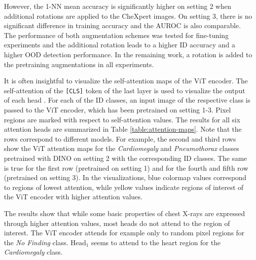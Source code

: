 However, the 1-NN mean accuracy is significantly higher on setting 2 when additional rotations are applied to the CheXpert images.
On setting 3, there is no significant difference in training accuracy and the AUROC is also comparable.
The performance of both augmentation schemes was tested for fine-tuning experiments and the additional rotation leads to a higher ID accuracy and a higher OOD detection performance. 
In the remaining work, a rotation is added to the pretraining augmentations in all experiments.
\par
It is often insightful to visualize the self-attention maps of the ViT encoder.
The self-attention of the \texttt{[CLS]} token of the last layer is used to visualize the output of each head \citep{Caron2021,Dosovitskiy2020}.
For each of the ID classes, an input image of the respective class is passed to the ViT encoder, which has been pretrained on setting 1-3.
Pixel regions are marked with respect to self-attention values.
The results for all six attention heads are summarized in Table \ref{table:attention-maps}.
Note that the rows correspond to different models.
For example, the second and third rows show the ViT attention maps for the \textit{Cardiomegaly} and \textit{Pneumothorax} classes pretrained with DINO on setting 2 with the corresponding ID classes.
The same is true for the first row (pretrained on setting 1) and for the fourth and fifth row (pretrained on setting 3).
In the visualizations, blue colormap values correspond to regions of lowest attention, while yellow values indicate regions of interest of the ViT encoder with higher attention values.
\par
The results show that while some basic properties of chest X-rays are expressed through higher attention values, most heads do not attend to the region of interest.
The ViT encoder attends for example only to random pixel regions for the \textit{No Finding} class.
$\text{Head}_1$ seems to attend to the heart region for the \textit{Cardiomegaly} class.
